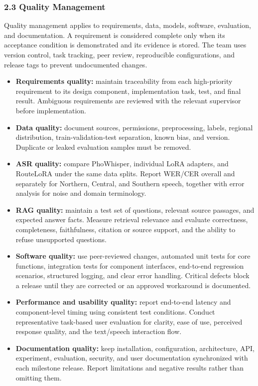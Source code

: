 \documentclass[11pt,a4paper]{article}
\begin{document}
\FloatBarrier

\subsubsection{2.3 Quality Management}

Quality management applies to requirements, data, models, software, evaluation,
and documentation. A requirement is considered complete only when its
acceptance condition is demonstrated and its evidence is stored. The team uses
version control, task tracking, peer review, reproducible configurations, and
release tags to prevent undocumented changes.

\begin{itemize}
  \item \textbf{Requirements quality:} maintain traceability from each
  high-priority requirement to its design component, implementation task, test,
  and final result. Ambiguous requirements are reviewed with the relevant
  supervisor before implementation.

  \item \textbf{Data quality:} document sources, permissions, preprocessing,
  labels, regional distribution, train-validation-test separation, known bias,
  and version. Duplicate or leaked evaluation samples must be removed.

  \item \textbf{ASR quality:} compare PhoWhisper, individual LoRA adapters, and
  RouteLoRA under the same data splits. Report WER/CER overall and separately
  for Northern, Central, and Southern speech, together with error analysis for
  noise and domain terminology.

  \item \textbf{RAG quality:} maintain a test set of questions, relevant source
  passages, and expected answer facts. Measure retrieval relevance and evaluate
  correctness, completeness, faithfulness, citation or source support, and the
  ability to refuse unsupported questions.

  \item \textbf{Software quality:} use peer-reviewed changes, automated unit
  tests for core functions, integration tests for component interfaces,
  end-to-end regression scenarios, structured logging, and clear error handling.
  Critical defects block a release until they are corrected or an approved
  workaround is documented.

  \item \textbf{Performance and usability quality:} report end-to-end latency
  and component-level timing using consistent test conditions. Conduct
  representative task-based user evaluation for clarity, ease of use, perceived
  response quality, and the text/speech interaction flow.

  \item \textbf{Documentation quality:} keep installation, configuration,
  architecture, API, experiment, evaluation, security, and user documentation
  synchronized with each milestone release. Report limitations and negative
  results rather than omitting them.
\end{itemize}
\end{document}
